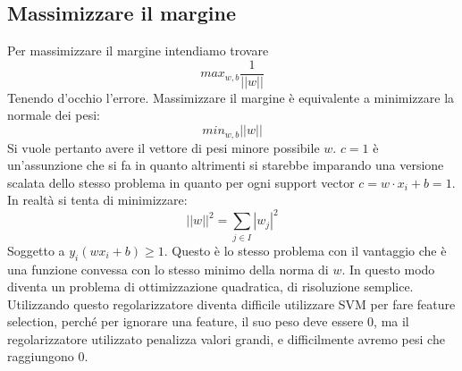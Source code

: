	\subsection{Massimizzare il margine}
	Per massimizzare il margine intendiamo trovare
	$$max_{w,b}\dfrac{1}{||w||}$$
	Tenendo d'occhio l'errore.
	Massimizzare il margine \`e equivalente a minimizzare la normale dei pesi:
	$$min_{w,b}||w||$$
	Si vuole pertanto avere il vettore di pesi minore possibile $w$.
	$c=1$ \`e un'assunzione che si fa in quanto altrimenti si starebbe imparando una versione scalata dello stesso problema in quanto per ogni support vector $c = w\cdot x_i +b = 1$.
	In realt\`a si tenta di minimizzare:
	$$||w||^2 = \sum\limits_{j\in I}|w_j|^2$$
	Soggetto a $y_i(wx_i+b) \ge 1$.
	Questo \`e lo stesso problema con il vantaggio che \`e una funzione convessa con lo stesso minimo della norma di $w$.
	In questo modo diventa un problema di ottimizzazione quadratica, di risoluzione semplice. Utilizzando questo regolarizzatore diventa difficile utilizzare SVM per fare feature selection, perché per ignorare una feature, il suo peso deve essere 0, ma il regolarizzatore utilizzato penalizza valori grandi, e difficilmente avremo pesi che raggiungono 0.

